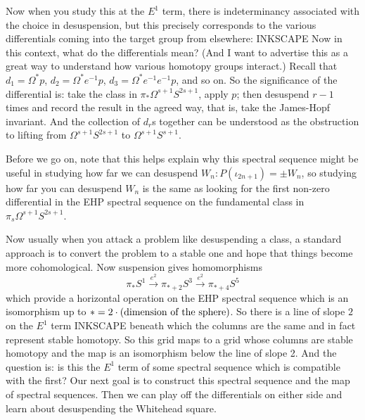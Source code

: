 \documentclass{article}
\newcommand{\Loops}{\Omega}
\begin{document}
Now when you study this at the $E^1$ term, there is indeterminancy associated with the choice in desuspension, but this precisely corresponds to the various differentials coming into the target group from elsewhere: INKSCAPE  Now in this context, what do the differentials mean?  (And I want to advertise this as a great way to understand how various homotopy groups interact.)  Recall that $d_1 = \Loops^* p$, $d_2 = \Loops^* e^{-1} p$, $d_3 = \Loops^* e^{-1} e^{-1} p$, and so on.  So the significance of the differential is: take the class in $\pi_* \Loops^{s+1} S^{2s+1}$, apply $p$; then desuspend $r-1$ times and record the result in the agreed way, that is, take the James-Hopf invariant.  And the collection of $d_r$s together can be understood as the obstruction to lifting from $\Loops^{s+1} S^{2s+1}$ to $\Loops^{s+1} S^{s+1}$.

Before we go on, note that this helps explain why this spectral sequence might be useful in studying how far we can desuspend $W_n: P(\iota_{2n+1}) = \pm W_n$, so studying how far you can desuspend $W_n$ is the same as looking for the first non-zero differential in the EHP spectral sequence on the fundamental class in $\pi_s \Loops^{s+1} S^{2s+1}$.

Now usually when you attack a problem like desuspending a class, a standard approach is to convert the problem to a stable one and hope that things become more cohomological.  Now suspension gives homomorphisms
\[
\pi_* S^1 \stackrel{e^2}{\to} \pi_{*+2} S^3 \stackrel{e^2}{\to} \pi_{*+4} S^5
\]
which provide a horizontal operation on the EHP spectral sequence which is an isomorphism up to $* = 2 \cdot (\hbox{dimension of the sphere})$.  So there is a line of slope $2$ on the $E^1$ term INKSCAPE beneath which the columns are the same and in fact represent stable homotopy.  So this grid maps to a grid whose columns are stable homotopy and the map is an isomorphism below the line of slope 2.  And the question is: is this the $E^1$ term of some spectral sequence which is compatible with the first?  Our next goal is to construct this spectral sequence and the map of spectral sequences.  Then we can play off the differentials on either side and learn about desuspending the Whitehead square.
\end{document}
